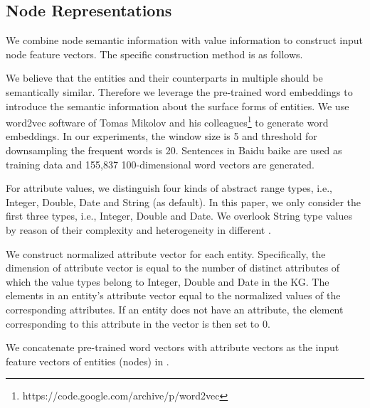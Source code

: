 	\subsection{Node Representations}
	\label{subsection:Node Representations}
	We combine node semantic information with value information to construct input node feature vectors. The specific construction method is as follows.
	
	\label{wordvector}
	We believe that the entities and their counterparts in multiple \KGs should be semantically similar. Therefore we leverage the pre-trained word embeddings to introduce the semantic information about the surface forms of entities.
	We use word2vec software of Tomas Mikolov and his colleagues\footnote{https://code.google.com/archive/p/word2vec} to generate word embeddings. In our experiments, the window size is 5 and threshold for downsampling the frequent words is 20. Sentences in Baidu baike are used as training data and 155,837 100-dimensional word vectors are generated.
	
	For attribute values, we distinguish four kinds of abstract range types, i.e., Integer, Double, Date and String (as default). In this paper, we only consider the first three types, i.e., Integer, Double and Date. We overlook String type values by reason of their complexity and heterogeneity in different \KGs.
	
	We construct normalized attribute vector for each entity. Specifically, the dimension of attribute vector is equal to the number of distinct attributes of which the value types belong to Integer, Double and Date in the KG. The elements in an entity’s attribute vector equal to the normalized values of the corresponding attributes. If an entity does not have an attribute, the element corresponding to this attribute in the vector is then set to 0.
	
	We concatenate pre-trained word vectors with attribute vectors as the input feature vectors of entities (nodes) in \KGs.
	
